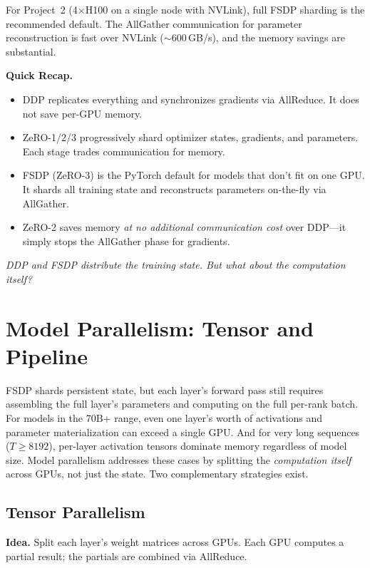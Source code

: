 For Project~2 (4$\times$H100 on a single node with NVLink), full FSDP sharding is the recommended default. The AllGather communication for parameter reconstruction is fast over NVLink ($\sim$600\,GB/s), and the memory savings are substantial.


\begin{quickrecap}
\textbf{Quick Recap.}
\begin{itemize}[nosep,leftmargin=1.5em]
  \item DDP replicates everything and synchronizes gradients via AllReduce. It does not save per-GPU memory.
  \item ZeRO-1/2/3 progressively shard optimizer states, gradients, and parameters. Each stage trades communication for memory.
  \item FSDP (ZeRO-3) is the PyTorch default for models that don't fit on one GPU. It shards all training state and reconstructs parameters on-the-fly via AllGather.
  \item ZeRO-2 saves memory \emph{at no additional communication cost} over DDP---it simply stops the AllGather phase for gradients.
\end{itemize}
\textit{DDP and FSDP distribute the training state. But what about the computation itself?}
\end{quickrecap}


\section{Model Parallelism: Tensor and Pipeline}
\label{sec:model-parallelism}

FSDP shards persistent state, but each layer's forward pass still requires assembling the full layer's parameters and computing on the full per-rank batch. For models in the 70B+ range, even one layer's worth of activations and parameter materialization can exceed a single GPU. And for very long sequences ($T \geq 8192$), per-layer activation tensors dominate memory regardless of model size. Model parallelism addresses these cases by splitting the \emph{computation itself} across GPUs, not just the state. Two complementary strategies exist.

\subsection{Tensor Parallelism}
\label{sec:tensor-parallelism}

\textbf{Idea.} Split each layer's weight matrices across GPUs. Each GPU computes a partial result; the partials are combined via AllReduce.

